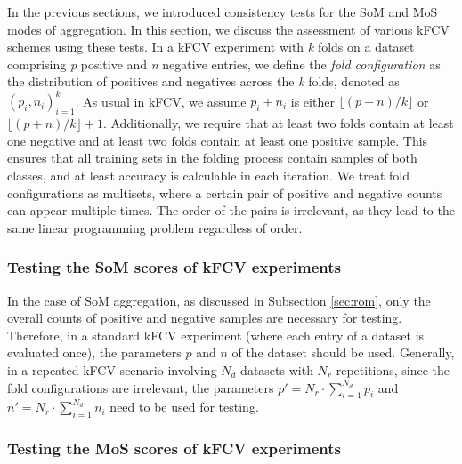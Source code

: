 \documentclass[3p, times]{elsarticle}
\begin{document}
In the previous sections, we introduced consistency tests for the SoM and MoS modes of aggregation. In this section, we discuss the assessment of various kFCV schemes using these tests. In a kFCV experiment with \emph{k} folds on a dataset comprising \emph{p} positive and \emph{n} negative entries, we define the \emph{fold configuration} as the distribution of positives and negatives across the \emph{k} folds, denoted as $(p_i, n_i)_{i=1}^{k}$. As usual in kFCV, we assume $p_i + n_i$ is either $\lfloor (p + n) / k\rfloor$ or $\lfloor (p + n) / k\rfloor + 1$. Additionally, we require that at least two folds contain at least one negative and at least two folds contain at least one positive sample. This ensures that all training sets in the folding process contain samples of both classes, and at least accuracy is calculable in each iteration. We treat fold configurations as multisets, where a certain pair of positive and negative counts can appear multiple times. The order of the pairs is irrelevant, as they lead to the same linear programming problem regardless of order.


\subsubsection{Testing the SoM scores of kFCV experiments}
\label{sec:somkfcv}

In the case of SoM aggregation, as discussed in Subsection \ref{sec:rom}, only the overall counts of positive and negative samples are necessary for testing. Therefore, in a standard kFCV experiment (where each entry of a dataset is evaluated once), the parameters $p$ and $n$ of the dataset should be used. Generally, in a repeated kFCV scenario involving $N_d$ datasets with $N_r$ repetitions, since the fold configurations are irrelevant, the parameters $p'=N_r\cdot \sum\limits_{i=1}^{N_d} p_i$ and $n'=N_r\cdot \sum\limits_{i=1}^{N_d} n_i$ need to be used for testing.

\subsubsection{Testing the MoS scores of kFCV experiments}
\label{sec:moskfcv}
\end{document}
